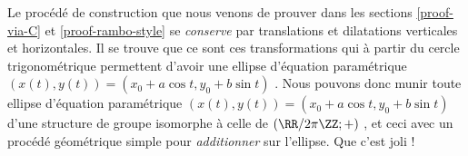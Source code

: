 Le procédé de construction que nous venons de prouver dans les sections \ref{proof-via-C} et \ref{proof-rambo-style} se \emph{\og conserve \fg} par translations et dilatations verticales et horizontales.
Il se trouve que ce sont ces transformations qui à partir du cercle trigonométrique permettent d'avoir une ellipse d'équation paramétrique $(x(t) , y(t)) = (x_0 + a \cos t , y_0 + b \sin t)$ .
Nous pouvons donc munir toute ellipse d'équation paramétrique $(x(t) , y(t)) = (x_0 + a \cos t , y_0 + b \sin t)$ d'une structure de groupe isomorphe à celle de $(\RR / 2 \pi \ZZ ; +)$ , et ceci avec un procédé géométrique simple pour \emph{\og additionner \fg} sur l'ellipse. Que c'est joli !

